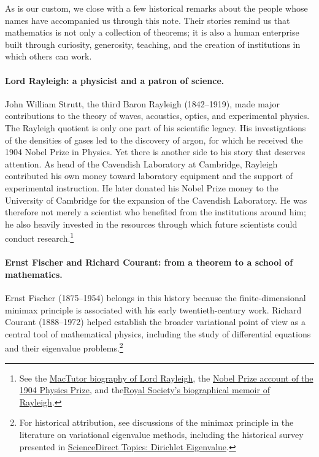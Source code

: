 \documentclass[14pt,letterpaper]{article}
\theoremstyle{plain}
\theoremstyle{definition}
\theoremstyle{remark}
\begin{document}
As is our custom, we close with a few historical remarks
about the people whose names have accompanied us through
this note. Their stories remind us that mathematics is not
only a collection of theorems; it is also a human enterprise
built through curiosity, generosity, teaching, and the
creation of institutions in which others can work.

\paragraph{Lord Rayleigh: a physicist and a patron of science.}
John William Strutt, the third Baron Rayleigh
(1842--1919), made major contributions to the theory of
waves, acoustics, optics, and experimental physics. The
Rayleigh quotient is only one part of his scientific
legacy. His investigations of the densities of gases led
to the discovery of argon, for which he received the 1904
Nobel Prize in Physics. Yet there is another side to his
story that deserves attention. As head of the Cavendish
Laboratory at Cambridge, Rayleigh contributed his own money
toward laboratory equipment and the support of experimental
instruction. He later donated his Nobel Prize money to
the University of Cambridge for the expansion of the
Cavendish Laboratory. He was therefore not merely a
scientist who benefited from the institutions around him;
he also heavily invested in the resources through which future
scientists could conduct research.\footnote{See the
\href{https://mathshistory.st-andrews.ac.uk/Biographies/Rayleigh/}{MacTutor biography of Lord Rayleigh},
the \href{https://www.nobelprize.org/prizes/physics/1904/summary/}{Nobel Prize account of the 1904 Physics Prize},
and the\href{https://mathshistory.st-andrews.ac.uk/RS/rayleigh_rs.pdf}{Royal Society's biographical memoir of Rayleigh}.}

\paragraph{Ernst Fischer and Richard Courant: from a theorem to a school of mathematics.}
Ernst Fischer (1875--1954) belongs in this history because
the finite-dimensional minimax principle is associated
with his early twentieth-century work. Richard Courant
(1888--1972) helped establish the broader variational
point of view as a central tool of mathematical physics,
including the study of differential equations and their
eigenvalue problems.\footnote{For historical attribution,
see discussions of the minimax principle in the literature
on variational eigenvalue methods, including the historical
survey presented in
\href{https://www.sciencedirect.com/topics/mathematics/dirichlet-eigenvalue}{ScienceDirect Topics: Dirichlet Eigenvalue}.}
\end{document}
